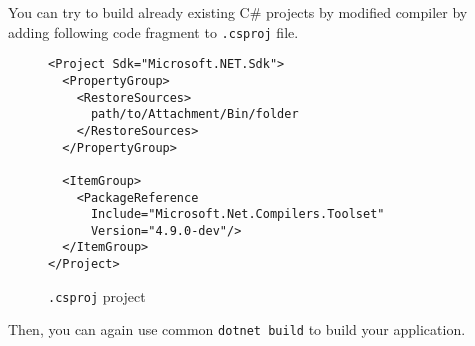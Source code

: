 You can try to build already existing C\# projects by modified compiler by adding following code fragment to \texttt{.csproj} file.
\begin{figure}[h]
\begin{lstlisting}
<Project Sdk="Microsoft.NET.Sdk">
  <PropertyGroup>
    <RestoreSources>
      path/to/Attachment/Bin/folder
    </RestoreSources>
  </PropertyGroup>

  <ItemGroup>
    <PackageReference 
      Include="Microsoft.Net.Compilers.Toolset" 
      Version="4.9.0-dev"/>
  </ItemGroup>
</Project>
\end{lstlisting}
\caption{\texttt{.csproj} project}
\label{img81:usage}
\end{figure}
Then, you can again use common \texttt{dotnet build} to build your application.